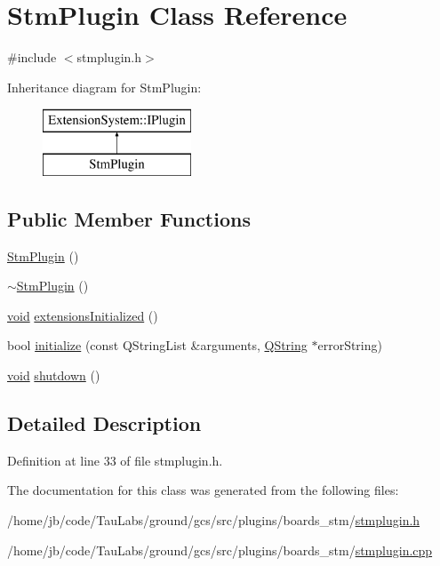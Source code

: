 \hypertarget{class_stm_plugin}{\section{\-Stm\-Plugin \-Class \-Reference}
\label{class_stm_plugin}
}


{\ttfamily \#include $<$stmplugin.\-h$>$}

\-Inheritance diagram for \-Stm\-Plugin\-:\begin{figure}[H]
\begin{center}
\leavevmode
\includegraphics[height=2.000000cm]{class_stm_plugin}
\end{center}
\end{figure}
\subsection*{\-Public \-Member \-Functions}
\begin{DoxyCompactItemize}
\item 
\hyperlink{group___boards___stm_gab32837a38747d81c460fd1ba4bc438f8}{\-Stm\-Plugin} ()
\item 
\hyperlink{group___boards___stm_gaa4103ec74dcbf5261ad6ae6dc37da0ea}{$\sim$\-Stm\-Plugin} ()
\item 
\hyperlink{group___u_a_v_objects_plugin_ga444cf2ff3f0ecbe028adce838d373f5c}{void} \hyperlink{group___boards___stm_ga5269accdd6abc59b3b45cdf2f944d205}{extensions\-Initialized} ()
\item 
bool \hyperlink{group___boards___stm_ga9cf15e32e77519654896a82f0b301710}{initialize} (const \-Q\-String\-List \&arguments, \hyperlink{group___u_a_v_objects_plugin_gab9d252f49c333c94a72f97ce3105a32d}{\-Q\-String} $\ast$error\-String)
\item 
\hyperlink{group___u_a_v_objects_plugin_ga444cf2ff3f0ecbe028adce838d373f5c}{void} \hyperlink{group___boards___stm_ga0f818aaaedbf072833aef3d3ac944593}{shutdown} ()
\end{DoxyCompactItemize}


\subsection{\-Detailed \-Description}


\-Definition at line 33 of file stmplugin.\-h.



\-The documentation for this class was generated from the following files\-:\begin{DoxyCompactItemize}
\item 
/home/jb/code/\-Tau\-Labs/ground/gcs/src/plugins/boards\-\_\-stm/\hyperlink{stmplugin_8h}{stmplugin.\-h}\item 
/home/jb/code/\-Tau\-Labs/ground/gcs/src/plugins/boards\-\_\-stm/\hyperlink{stmplugin_8cpp}{stmplugin.\-cpp}\end{DoxyCompactItemize}
